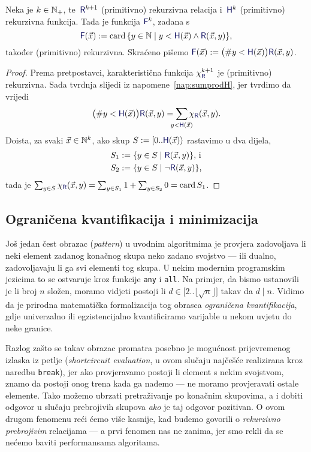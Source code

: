 \begin{lema}\label{lm:brojrek}
Neka je $k\in{\mathbb N}_+$, te\, $\f R^{k+1}$ (primitivno) rekurzivna relacija i\, $\f H^k$ (primitivno) rekurzivna funkcija. Tada je funkcija $\f F^k$, zadana s
\begin{equation}
    \f F(\vec x):=\card\,\{y\in\N\mid y<\f H(\vec x)\land\f R(\vec x,y)\}\text,
\end{equation}
također (primitivno) rekurzivna. Skraćeno pišemo $\f F(\vec x):=\bigl(\#y<\f H(\vec x)\bigr)\f R(\vec x,y)$.
\end{lema}
\begin{proof}
    Prema pretpostavci, karakteristična funkcija $\chi_{\f R}^{k+1}$ je (primitivno) rekurzivna. Sada tvrdnja slijedi iz napomene~\ref{nap:sumprodH}, jer tvrdimo da vrijedi
    \begin{equation}
        \bigl(\#y<\f H(\vec x)\bigr)\f R(\vec x,y)=\sum_{\mathclap{y<\f H(\vec x)}}\chi_{\f R}(\vec x,y)\text.
    \end{equation}
    Doista, za svaki $\vec x\in{\mathbb N}^k$, ako skup $S:=[0..\f H(\vec x)\rangle$ rastavimo u dva dijela,
    \begin{align}
        S_1&:=\{y\in S\mid\f R(\vec x,y)\}\text{, i}\\
        S_2&:=\{y\in S\mid\lnot\f R(\vec x,y)\}\text,
    \end{align}
    tada je
        $\sum_{y\in S}\chi_{\f R}(\vec x,y)=\sum_{y\in S_1}1+\sum_{y\in S_2}0=\card S_1$.
\end{proof}

\subsection{Ograničena kvantifikacija i minimizacija}

Još jedan čest obrazac (\emph{pattern}) u uvodnim algoritmima je provjera zadovoljava li neki element zadanog konačnog skupa neko zadano svojstvo --- ili dualno, zadovoljavaju li ga svi elementi tog skupa. U nekim modernim programskim jezicima to se ostvaruje kroz funkcije \texttt{any} i \texttt{all}. Na primjer, da bismo ustanovili je li broj $n$ složen, moramo vidjeti postoji li $d\in\bigl[2..\lfloor\sqrt{n}\rfloor\bigr]$ takav da $d\mathrel|n$. Vidimo da je prirodna matematička formalizacija tog obrasca \emph{ograničena kvantifikacija}, gdje univerzalno ili egzistencijalno kvantificiramo varijable u nekom uvjetu do neke granice.

Razlog zašto se takav obrazac promatra posebno je mogućnost prijevremenog izlaska iz petlje (\emph{shortcircuit evaluation}, u ovom slučaju najčešće realizirana kroz naredbu \texttt{break}), jer ako provjeravamo postoji li element s nekim svojstvom, znamo da postoji onog trena kada ga nađemo --- ne moramo provjeravati ostale elemente. Tako možemo ubrzati pretraživanje po konačnim skupovima, a i dobiti odgovor u slučaju prebrojivih skupova \emph{ako} je taj odgovor pozitivan. O ovom drugom fenomenu reći ćemo više kasnije, kad budemo govorili o \emph{rekurzivno prebrojivim} relacijama --- a prvi fenomen nas ne zanima, jer smo rekli da se nećemo baviti performansama algoritama.

